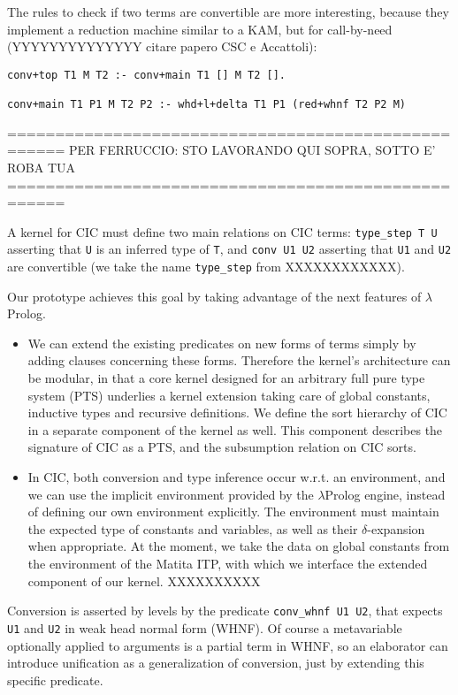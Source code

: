 The rules to check if two terms are convertible are more interesting, because they implement a reduction machine similar to a KAM, but for call-by-need (YYYYYYYYYYYYYY citare papero CSC e Accattoli):
\begin{verbatim}
conv+top T1 M T2 :- conv+main T1 [] M T2 [].

conv+main T1 P1 M T2 P2 :- whd+l+delta T1 P1 (red+whnf T2 P2 M)
\end{verbatim}


====================================================
PER FERRUCCIO: STO LAVORANDO QUI SOPRA, SOTTO E' ROBA TUA
====================================================

A kernel for CIC must define two main relations on CIC terms:
\verb+type_step T U+
asserting that \verb+U+ is an inferred type of \verb+T+,
and \verb+conv U1 U2+ 
asserting that \verb+U1+ and \verb+U2+ are convertible
(we take the name \verb+type_step+ from XXXXXXXXXXXX).

Our prototype achieves this goal by taking advantage of the next features of $\lambda$Prolog.

\begin{itemize}

\item
We can extend the existing predicates on new forms of terms
simply by adding clauses concerning these forms. 
Therefore the kernel's architecture can be modular,
in that a core kernel designed for an arbitrary full pure type system (PTS)
underlies a kernel extension taking care of global constants,
inductive types and recursive definitions.
We define the sort hierarchy of CIC in a separate component of the kernel as well.
This component describes the signature of CIC as a PTS,
and the subsumption relation on CIC sorts.

\item
In CIC, both conversion and type inference occur w.r.t. an environment,
and we can use the implicit environment provided by the
$\lambda$Prolog engine, instead of defining our own environment explicitly.
The environment must maintain the expected type of constants and variables,
as well as their $\delta$-expansion when appropriate.
At the moment, we take the data on global constants from the
environment of the Matita ITP, with which we interface the extended
component of our kernel. XXXXXXXXXX

\end{itemize}

Conversion is asserted by levels by the predicate \verb+conv_whnf U1 U2+,
that expects \verb+U1+ and \verb+U2+ in weak head normal form (WHNF).
Of course a metavariable optionally applied to arguments is a partial
term in WHNF, so an elaborator can introduce unification as a
generalization of conversion, just by extending this specific predicate.

